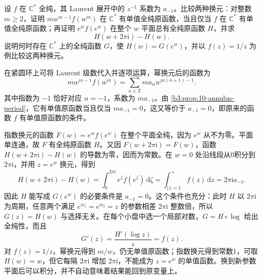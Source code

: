 \begin{exercise}\label{b3:ex:10-6}
设 \(f\) 在 \(\mathbb C^*\) 全纯，其 Laurent 展开中的 \(z^{-1}\) 系数为 \(a_{-1}\)。比较两种换元：对整数 \(m\ge2\)，证明 \(m w^{m-1}f(w^m)\) 在 \(\mathbb C^*\) 有单值全纯原函数，当且仅当 \(f\) 在 \(\mathbb C^*\) 有单值全纯原函数；再证明 \(e^w f(e^w)\) 在整个 \(w\) 平面总有全纯原函数 \(H\)，并求
\[
 H(w+2\pi\mathrm i)-H(w).
\]
说明何时存在 \(\mathbb C^*\) 上的全纯函数 \(G\)，使 \(H(w)=G(e^w)\)，并以 \(f(z)=1/z\) 为例比较这两种换元。
\end{exercise}
\begin{solution}
在紧圆环上可将 Laurent 级数代入并逐项运算，幂换元后的函数为
\[
 m w^{m-1}f(w^m)
 =\sum_{n\in\mathbb Z}m a_n w^{m(n+1)-1}.
\]
其中指数为 \(-1\) 恰好对应 \(n=-1\)，系数为 \(m a_{-1}\)。由 \cref{b3:prop:10-annulus-period}，它有单值原函数当且仅当 \(m a_{-1}=0\)，这又等价于 \(a_{-1}=0\)，即原来的函数 \(f\) 有单值原函数的条件。

指数换元的函数 \(F(w)=e^w f(e^w)\) 在整个平面全纯，因为 \(e^w\) 从不为零。平面单连通，故 \(F\) 有全纯原函数 \(H\)。又因 \(F(w+2\pi\mathrm i)=F(w)\)，函数 \(H(w+2\pi\mathrm i)-H(w)\) 的导数为零，因而为常数。在 \(w=0\) 处沿线段从0积分到 \(2\pi\mathrm i\)，并用 \(z=e^w\) 换元，得到
\[
 H(w+2\pi\mathrm i)-H(w)
 =\int_0^{2\pi\mathrm i}e^\zeta f(e^\zeta)\,\mathrm d\zeta
 =\int_{|z|=1}^{+}f(z)\,\mathrm dz
 =2\pi\mathrm i a_{-1}.
\]
因此 \(H\) 能写成 \(G(e^w)\) 的必要条件是 \(a_{-1}=0\)。这个条件也充分：此时 \(H\) 以 \(2\pi\mathrm i\) 为周期，任意两个满足 \(e^{w_1}=e^{w_2}=z\) 的参数相差 \(2\pi\mathrm i\) 整数倍，所以 \(G(z)=H(w)\) 与选择无关。在每个小盘中选一个局部对数，\(G=H\circ\log\) 给出全纯性，而且
\[
 G'(z)=\frac{H'(\log z)}z=f(z).
\]
对 \(f(z)=1/z\)，幂换元得到 \(m/w\)，仍无单值原函数；指数换元得到常数1，可取 \(H(w)=w\)，但它每隔 \(2\pi\mathrm i\) 增加 \(2\pi\mathrm i\)，不能成为 \(z=e^w\) 的单值函数。换到新参数平面后可以积分，并不自动意味着结果能回到原变量上。
\end{solution}

